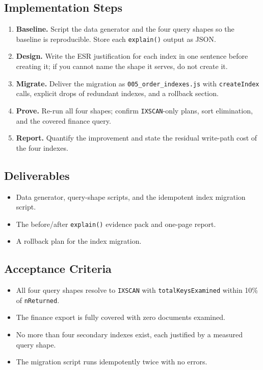 \subsection*{Implementation Steps}
\begin{enumerate}
    \item \textbf{Baseline.} Script the data generator and the four query shapes so the baseline is reproducible. Store each \texttt{explain()} output as JSON.
    \item \textbf{Design.} Write the ESR justification for each index in one sentence before creating it; if you cannot name the shape it serves, do not create it.
    \item \textbf{Migrate.} Deliver the migration as \texttt{005\_order\_indexes.js} with \texttt{createIndex} calls, explicit drops of redundant indexes, and a rollback section.
    \item \textbf{Prove.} Re-run all four shapes; confirm \texttt{IXSCAN}-only plans, sort elimination, and the covered finance query.
    \item \textbf{Report.} Quantify the improvement and state the residual write-path cost of the four indexes.
\end{enumerate}

\subsection*{Deliverables}
\begin{itemize}
    \item Data generator, query-shape scripts, and the idempotent index migration script.
    \item The before/after \texttt{explain()} evidence pack and one-page report.
    \item A rollback plan for the index migration.
\end{itemize}

\subsection*{Acceptance Criteria}
\begin{itemize}
    \item All four query shapes resolve to \texttt{IXSCAN} with \texttt{totalKeysExamined} within 10\% of \texttt{nReturned}.
    \item The finance export is fully covered with zero documents examined.
    \item No more than four secondary indexes exist, each justified by a measured query shape.
    \item The migration script runs idempotently twice with no errors.
\end{itemize}

